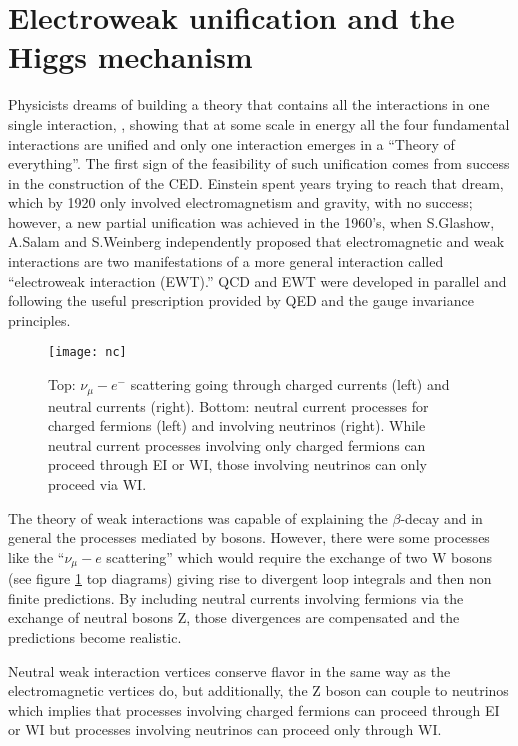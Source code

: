 \section{Electroweak unification and the Higgs mechanism}\label{sec:EWI}

\noindent Physicists dreams of building a theory that contains all the interactions in one single interaction, \ie, showing that at some scale in energy all the four fundamental interactions are unified and only one interaction emerges in a ``Theory of everything''. The first sign of the feasibility of such unification comes from success in the construction of the CED. Einstein spent years trying to reach that dream, which by 1920 only involved electromagnetism and gravity, with no success; however, a new partial unification was achieved in the 1960's, when S.Glashow\cite{glashow}, A.Salam\cite{salam} and S.Weinberg \cite{weinberg} independently proposed that electromagnetic and weak interactions are two manifestations of a more general interaction called ``electroweak interaction (EWT).'' QCD and EWT were developed in parallel and following the useful prescription provided by QED and the gauge invariance principles.\\
\begin{figure}[h!]
  \centering
  \texttt{[image: nc]}
  \caption[Neutral current processes]{Top: $\nu_{\mu}-e^-$ scattering going through charged currents (left) and neutral currents (right). Bottom: neutral current processes for charged fermions (left) and involving neutrinos (right). While neutral current processes involving only charged fermions can proceed through EI or WI, those involving neutrinos can only proceed via WI.}%
         \label{nc}
\end{figure}
         
\noindent The theory of weak interactions was capable of explaining the $\beta$-decay and in general the processes mediated by \wpm bosons. However, there were some processes like the ``$\nu_\mu - e$ scattering'' which would require the exchange of two W bosons (see figure \ref{nc} top diagrams) giving rise to divergent loop integrals and then non finite predictions. By including neutral currents involving fermions via the exchange of neutral bosons Z, those divergences are compensated and the predictions become realistic.

\noindent Neutral weak interaction vertices conserve flavor in the same way as the electromagnetic vertices do, but additionally, the Z boson can couple to neutrinos which implies that processes involving charged fermions can proceed through EI or WI but processes involving neutrinos can proceed only through WI.\\   

